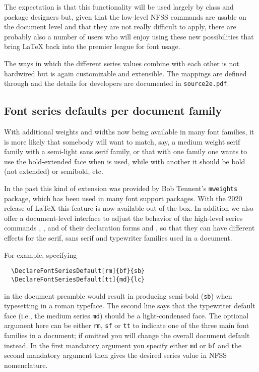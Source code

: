 \documentclass{ltnews}
\providecommand\file[1]{\texttt{#1}}
\providecommand\pkg[1]{\texttt{#1}}
\begin{document}
The expectation is that this functionality will be used largely by
class and package designers but, given that the low-level NFSS
commands are usable on the document level and that they are not really
difficult to apply, there are probably also a number of users who will
enjoy using these new possibilities that bring \LaTeX{} back into the
premier league for font usage.

The ways in which the different series values combine with each other is not
hardwired but is again customizable and extensible. The mappings are
defined through  and the details for
developers are documented in \file{source2e.pdf}.


\subsection{Font series defaults per document family}

With additional weights and widths now being available in
many font families, it is more likely that somebody will want to
match, say, a medium weight serif family with a semi-light sans serif
family, or that with one family one wants to use the bold-extended
face when  is used, while with another it should be bold
(not extended) or semibold, etc.

In the past this kind of extension was provided by Bob Tennent's
\pkg{mweights} package, which has been used in many font
support packages.
With the 2020 release of \LaTeX{} this feature is now available out
of the box.  In addition we also offer a document-level interface to adjust the
behavior of the high-level series commands , , and of their
declaration forms  and , so that they can
have different effects for the serif, sans serif and typewriter
families used in a document.

For example, specifying
\begin{verbatim}
  \DeclareFontSeriesDefault[rm]{bf}{sb}
  \DeclareFontSeriesDefault[tt]{md}{lc}
\end{verbatim}
in the document preamble would result in  producing
semi-bold (\texttt{sb}) when typesetting in a roman typeface.
The second line says that the
typewriter default face (i.e., the medium series \texttt{md}) should be
a light-condensed face. The optional argument here can be either
\texttt{rm}, \texttt{sf} or \texttt{tt} to indicate one of the three
main font families in a document; if omitted you will change the
overall document default instead.  In the first mandatory argument you
specify either \texttt{md} or \texttt{bf} and the second mandatory
argument then gives the desired series value in NFSS nomenclature.
\end{document}
